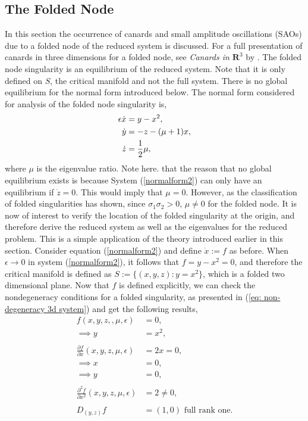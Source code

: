 \subsection{The Folded Node}
In this section the occurrence of canards and small amplitude oscillations (SAOs) due to a folded node of the reduced system is discussed. For a full presentation of canards in three dimensions for a folded node, see \textit{Canards in $ \mathbf{R}^3 $} by  \citet{wechselberger2005}.
The folded node singularity is an equilibrium of the reduced system. Note that it is only defined on $S$, the critical manifold and not the full system. There is no global equilibrium for the normal form introduced below.
The normal form considered for analysis of the folded node singularity is,
\begin{align}\label{normalform2}
\epsilon \dot{x} &= y - x^2,\\ \notag
\dot{y} &=- z -(\mu +1)x, \\
\dot{z} &= \frac{1}{2} \mu, \notag
\end{align}
where $\mu$ is the eigenvalue ratio. Note here. that the reason that no global equilibrium exists is because System (\ref{normalform2}) can only have an equilibrium if $\dot{z} =0$. This would imply that $\mu=0$. However, as the classification of folded singularities has shown, since $\sigma_1 \sigma_2 >0$,  $\mu \neq 0$ for the folded node.
It is now of interest to verify the location of the folded singularity at the origin, and therefore derive the reduced system as well as the eigenvalues for the reduced problem.
This is a simple application of the theory introduced earlier in this section.
Consider equation (\ref{normalform2}) and define $\dot{x}:=f$ as before. When $\epsilon \to 0$ in system (\ref{normalform2}), it follows that $f= y-x^2 =0$, and therefore the critical manifold is defined as $S:= \{ (x,y,z) : y=x^2\}$, which is a folded two dimensional plane.
Now that $f$ is defined explicitly, we can check the nondegeneracy conditions for a folded singularity, as presented in (\ref{eq: non-degeneracy 3d system}) and get the following results,
\begin{align*}
f(x,y,z,,\mu, \epsilon) &= 0,\\
\implies y&=x^2,\\
\\
\frac{\partial f}{\partial x} (x,y,z,\mu,\epsilon) &= 2x = 0,\\
\implies x&=0, \\
\implies y&=0, \\
\\
\frac{\partial^2 f}{\partial x^2}(x,y,z,\mu,\epsilon) & = 2 \neq 0,\\
\\
D_{(y,z)}f&= (1,0) \textrm{ full rank one}.
\end{align*}
